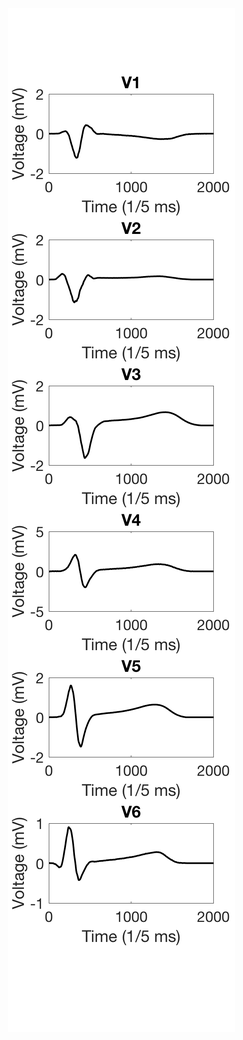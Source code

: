 \documentclass[12pt]{article}
\begin{document}
\begin{figure}[H]
	
	\centering
	\includegraphics[width = .95\textwidth]{Figures/Precordial_timeallign_sigaveraged.png}
	\caption{ }
	\label{fig:PrecordSig}
\end{figure}
\end{document}
